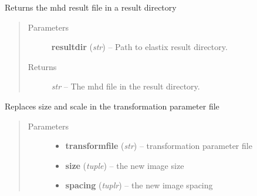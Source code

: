 \documentclass[letterpaper,10pt,english]{sphinxmanual}
\begin{document}

\begin{fulllineitems}
\label{api/ClearMap.Alignment:ClearMap.Alignment.Elastix.getResultDataFile}
Returns the mhd result file in a result directory
\begin{quote}\begin{description}
\item[{Parameters}] \leavevmode
\textbf{resultdir} (\emph{str}) --
Path to elastix result directory.

\item[{Returns}] \leavevmode
\emph{str} --
The mhd file in the result directory.

\end{description}\end{quote}

\end{fulllineitems}


\begin{fulllineitems}
\label{api/ClearMap.Alignment:ClearMap.Alignment.Elastix.setTransformFileSizeAndSpacing}
Replaces size and scale in the transformation parameter file
\begin{quote}\begin{description}
\item[{Parameters}] \leavevmode\begin{itemize}
\item {} 
\textbf{transformfile} (\emph{str}) --
transformation parameter file

\item {} 
\textbf{size} (\emph{tuple}) --
the new image size

\item {} 
\textbf{spacing} (\emph{tuplr}) --
the new image spacing

\end{itemize}

\end{description}\end{quote}

\end{fulllineitems}

\end{document}

